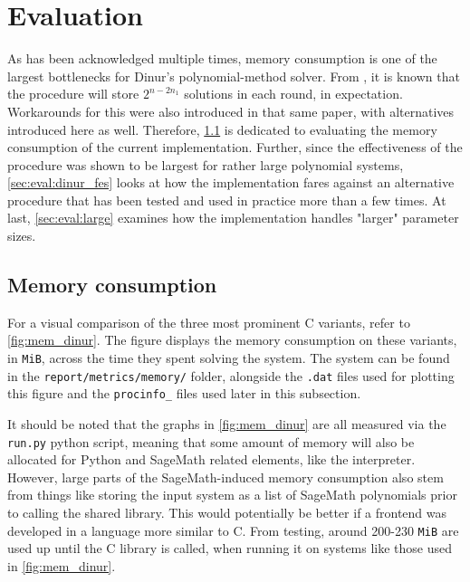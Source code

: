 \chapter{Evaluation} \label{sec:eval}
As has been acknowledged multiple times, memory consumption is one of the largest bottlenecks for Dinur's polynomial-method solver. From \cite{eurocrypt-2021-30841}, it is known that the procedure will store $2^{n - 2n_1}$ solutions in each round, in expectation. Workarounds for this were also introduced in that same paper, with alternatives introduced here as well. Therefore, \cref{sec:eval:mem} is dedicated to evaluating the memory consumption of the current implementation. Further, since the effectiveness of the procedure was shown to be largest for rather large polynomial systems, \cref{sec:eval:dinur_fes} looks at how the implementation fares against an alternative procedure that has been tested and used in practice more than a few times. At last, \cref{sec:eval:large} examines how the implementation handles "larger" parameter sizes.

\section{Memory consumption} \label{sec:eval:mem}

For a visual comparison of the three most prominent C variants, refer to \cref{fig:mem_dinur}. The figure displays the memory consumption on these variants, in \texttt{MiB}, across the time they spent solving the system. The system can be found in the \texttt{report/metrics/memory/} folder, alongside the \texttt{.dat} files used for plotting this figure and the \texttt{procinfo\_} files used later in this subsection.

It should be noted that the graphs in \cref{fig:mem_dinur} are all measured via the \texttt{run.py} python script, meaning that some amount of memory will also be allocated for Python and SageMath related elements, like the interpreter. However, large parts of the SageMath-induced memory consumption also stem from things like storing the input system as a list of SageMath polynomials prior to calling the shared library. This would potentially be better if a frontend was developed in a language more similar to C. From testing, around 200-230 \texttt{MiB} are used up until the C library is called, when running it on systems like those used in \cref{fig:mem_dinur}.

